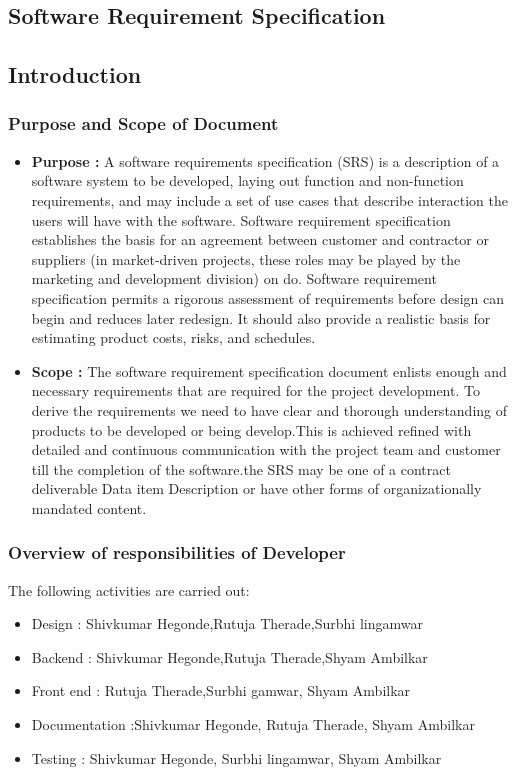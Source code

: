 \documentclass[10pt,a4paper]
{article}
\numberwithin{table}{section}
\begin{document}
{{\begin{normalsize}
\newpage
\begin{center}
\begin{huge}
\section{Software Requirement Specification}
\end{huge}
\end{center}
\subsection{Introduction}
\subsubsection{Purpose and Scope of Document}
\begin{itemize}
\item \textbf{Purpose :}
A software requirements specification (SRS) is a description of a software system to be developed, laying out function and non-function requirements, and may include a set of use cases that describe interaction the users will have with the software.
Software requirement specification establishes the basis for an agreement between customer and contractor or suppliers (in market-driven projects, these roles may be played by the marketing and development division) on do. Software requirement specification permits a rigorous assessment of requirements before design can begin and reduces later redesign. It should also provide a realistic basis for estimating product costs, risks, and schedules. 
\item \textbf{Scope :}
The software requirement specification document enlists enough and necessary requirements that are required for the project development. To derive the requirements we need to have clear and thorough understanding of products to be developed or being develop.This is achieved refined with detailed and continuous communication with the project team and customer till the completion of the software.the SRS may be one of a contract deliverable Data item Description or have other forms of organizationally mandated content.
\end{itemize}

\subsubsection{Overview of responsibilities of Developer}
The following activities are carried out:
\begin{itemize}
\item Design : Shivkumar Hegonde,Rutuja Therade,Surbhi lingamwar 
\item Backend : Shivkumar Hegonde,Rutuja Therade,Shyam Ambilkar 
\item Front end : Rutuja Therade,Surbhi gamwar, Shyam Ambilkar
\item Documentation :Shivkumar Hegonde, Rutuja Therade, Shyam Ambilkar
\item Testing : Shivkumar Hegonde, Surbhi lingamwar, Shyam Ambilkar



\end{itemize}
\end{normalsize}}}
\end{document}
